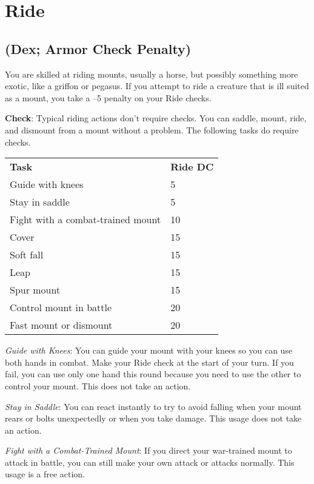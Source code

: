 \section{Ride}

\label{f0}
\subsection{(Dex; Armor Check Penalty)}

				
You are skilled at riding mounts, usually a horse, but possibly something more exotic, like a griffon or pegasus. If you attempt to ride a creature that is ill suited as a mount, you take a --5 penalty on your Ride checks.
				
\textbf{Check}: Typical riding actions don't require checks. You can saddle, mount, ride, and dismount from a mount without a problem. The following tasks do require checks.
\begin{table}
 \begin{tabular}{ll}
\textbf{Task} & \textbf{Ride DC}\\
Guide with knees & 5\\
Stay in saddle & 5\\
Fight with a combat-trained mount & 10\\
Cover & 15\\
Soft fall & 15\\
Leap & 15\\
Spur mount&15\\
Control mount in battle&20\\
Fast mount or dismount&20\\
 \end{tabular}

\end{table}


				
\textit{Guide with Knees}: You can guide your mount with your knees so you can use both hands in combat. Make your Ride check at the start of your turn. If you fail, you can use only one hand this round because you need to use the other to control your mount. This does not take an action.
				
\textit{Stay in Saddle}: You can react instantly to try to avoid falling when your mount rears or bolts unexpectedly or when you take damage. This usage does not take an action.
				
\textit{Fight with a Combat-Trained Mount}: If you direct your war-trained mount to attack in battle, you can still make your own attack or attacks normally. This usage is a free action.
				
